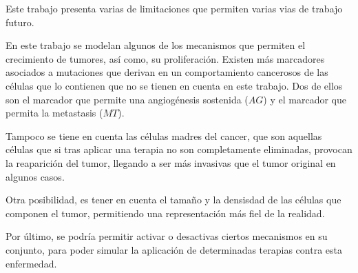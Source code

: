 Este trabajo presenta varias de limitaciones que permiten
varias vias de trabajo futuro.

En este trabajo se modelan algunos de los mecanismos que permiten
el crecimiento de tumores, así como, su proliferación. Existen más
marcadores asociados a mutaciones que derivan en un comportamiento cancerosos
de las células que lo contienen que no se tienen en cuenta en este
trabajo. Dos de ellos son el marcador que permite una angiogénesis
sostenida ($AG$) y el marcador que permita la metastasis ($MT$).

Tampoco se tiene en cuenta las células madres del cancer, que son
aquellas células que si tras aplicar una terapia no son completamente
eliminadas, provocan la reaparición del tumor, llegando a ser más
invasivas que el tumor original en algunos casos.

Otra posibilidad, es tener en cuenta el tamaño y la densisdad
de las células que componen el tumor, permitiendo una representación
más fiel de la realidad.

Por último, se podría permitir activar o desactivas ciertos mecanismos
en su conjunto, para poder simular la aplicación de determinadas terapias contra
esta enfermedad.
